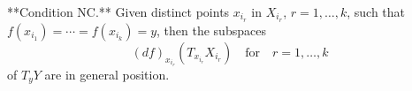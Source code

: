 **Condition NC.** Given distinct points $x_{i_r}$ in $X_{i_r}$, $r = 1, \ldots, k$, such that $f(x_{i_1}) = \cdots = f(x_{i_k}) = y$, then the subspaces
$$
(df)_{x_{i_r}}(T_{x_{i_r}}X_{i_r}) \quad \text{for} \quad r = 1, \ldots, k
$$
of $T_y Y$ are in general position.
